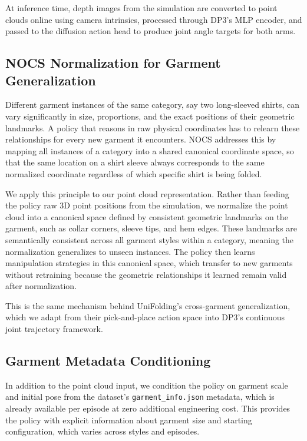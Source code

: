 At inference time, depth images from the simulation are converted to point clouds online using camera intrinsics, processed through DP3's MLP encoder, and passed to the diffusion action head to produce joint angle targets for both arms.

\subsection{NOCS Normalization for Garment Generalization}

Different garment instances of the same category, say two long-sleeved shirts, can vary significantly in size, proportions, and the exact positions of their geometric landmarks. A policy that reasons in raw physical coordinates has to relearn these relationships for every new garment it encounters. NOCS addresses this by mapping all instances of a category into a shared canonical coordinate space, so that the same location on a shirt sleeve always corresponds to the same normalized coordinate regardless of which specific shirt is being folded.

We apply this principle to our point cloud representation. Rather than feeding the policy raw 3D point positions from the simulation, we normalize the point cloud into a canonical space defined by consistent geometric landmarks on the garment, such as collar corners, sleeve tips, and hem edges. These landmarks are semantically consistent across all garment styles within a category, meaning the normalization generalizes to unseen instances. The policy then learns manipulation strategies in this canonical space, which transfer to new garments without retraining because the geometric relationships it learned remain valid after normalization.

This is the same mechanism behind UniFolding's cross-garment generalization, which we adapt from their pick-and-place action space into DP3's continuous joint trajectory framework.

\subsection{Garment Metadata Conditioning}

In addition to the point cloud input, we condition the policy on garment scale and initial pose from the dataset's \texttt{garment\_info.json} metadata, which is already available per episode at zero additional engineering cost. This provides the policy with explicit information about garment size and starting configuration, which varies across styles and episodes.


